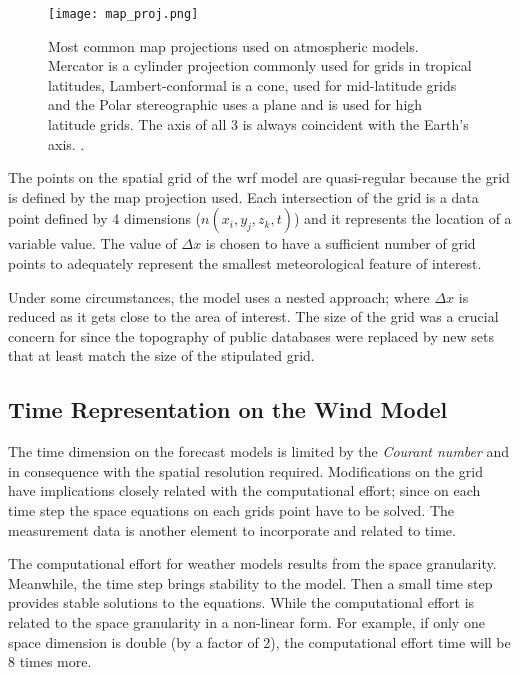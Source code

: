 \begin{figure}
    \centering
    \texttt{[image: map\_proj.png]}
    \caption{Most common map projections used on atmospheric models. Mercator is a cylinder projection commonly used for grids in tropical latitudes, Lambert-conformal is a cone, used for mid-latitude grids and the Polar stereographic uses a plane and is used for high latitude grids. The axis of all 3 is always coincident with the Earth's axis. \cite{warner2010numerical}.}
    \label{fig:map_projection}
\end{figure}

The points on the spatial grid of the \acrshort{wrf} model are quasi-regular because the grid is defined by the map projection used. Each intersection of the grid is a data point defined by 4 dimensions (\textit{$n(x_{i},y_{j},z_{k},t)$}) and it represents the location of a variable value. The value of $\Delta x$ is chosen to have a sufficient number of grid points to adequately represent the smallest meteorological feature of interest. \par

Under some circumstances, the model uses a nested approach; where $\Delta x$ is reduced as it gets close to the area of interest. The size of the grid was a crucial concern for \cite{giannaros2018ultrahigh} since the topography of public databases were replaced by new sets that at least match the size of the stipulated grid.\par

\subsection{Time Representation on the Wind Model}\label{sec:Time_onWindM}
The time dimension on the forecast models is limited by the \textit{Courant number} and in consequence with the spatial resolution required. Modifications on the grid have implications closely related with the computational effort; since on each time step the space equations on each grids point have to be solved. The measurement data is another element to incorporate and related to time. \par 

The computational effort for weather models results from the space granularity. Meanwhile, the time step brings stability to the model. Then a small time step provides stable solutions to the equations. While the computational effort is related to the space granularity in a non-linear form. For example, if only one space dimension is double (by a factor of 2), the computational effort time will be 8 times more. \par 

